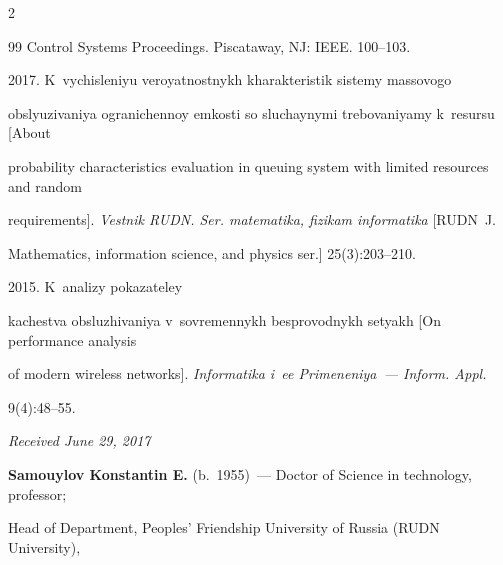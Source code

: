 \begin{multicols}{2}
{{\begin{thebibliography}{99}
{Control Systems Proceedings}. Piscataway, NJ: IEEE. 100--103. 


 2017. K~vychisleniyu veroyatnostnykh kha\-rak\-te\-ri\-stik sistemy massovogo 

obslyuzivaniya ogra\-ni\-chen\-noy emkosti so sluchaynymi trebovaniyamy k~re\-sur\-su [About 

probability characteristics evaluation in queuing system with limited resources and random 

requirements]. \textit{Vestnik RUDN. Ser. matematika, fizikam informatika} [RUDN~J. 

Mathematics, information science, and physics ser.] 25(3):203--210.


 2015. K~analizy pokazateley 

kachestva obsluzhivaniya v~sovremennykh besprovodnykh setyakh [On performance analysis 

of modern wireless networks]. \textit{Informatika i~ee Primeneniya~--- Inform. Appl.} 

9(4):48--55.  



\end{thebibliography}



 }

 }



\end{multicols}



\vspace*{-6pt}



\hfill{\small\textit{Received June 29, 2017}}



\vspace*{-10pt}





\Contr



\noindent

\textbf{Samouylov Konstantin E.} (b.\ 1955)~--- Doctor of Science in technology, professor; 

Head of Department, Peoples' Friendship University of Russia (RUDN University), 


